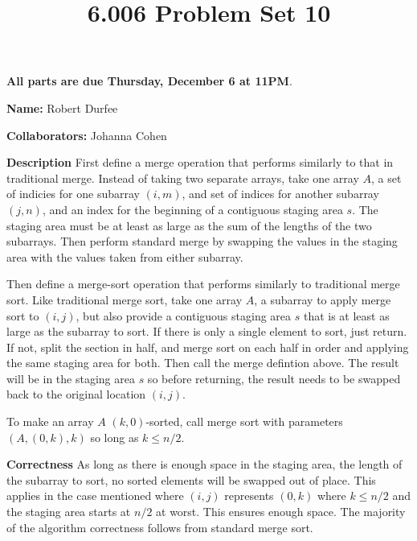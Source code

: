\documentclass[12pt,twoside]{article}
\title{6.006 Problem Set 10}
\newcommand{\theproblemsetnum}{10}
\newcommand{\releasedate}{Thursday, November 29}
\newcommand{\partaduedate}{Thursday, December 6}
\begin{document}
\handout{Problem Set \theproblemsetnum}{\releasedate}
\textbf{All parts are due {\bf \partaduedate} at {\bf 11PM}}.

\setlength{\parindent}{0pt}
\medskip\hrulefill\medskip

{\bf Name:} Robert Durfee

\medskip

{\bf Collaborators:} Johanna Cohen

\medskip\hrulefill

\begin{problems}

\problem  %

\begin{problemparts}
\problempart %

{\bf Description} First define a merge operation that performs similarly to
that in traditional merge. Instead of taking two separate arrays, take one
array $A$, a set of indicies for one subarray $(i, m)$, and set of indices
for another subarray $(j, n)$, and an index for the beginning of a contiguous
staging area $s$. The staging area must be at least as large as the sum of
the lengths of the two subarrays. Then perform standard merge by swapping the
values in the staging area with the values taken from either subarray.

Then define a merge-sort operation that performs similarly to traditional
merge sort. Like traditional merge sort, take one array $A$, a subarray to
apply merge sort to $(i, j)$, but also provide a contiguous staging area $s$
that is at least as large as the subarray to sort. If there is only a single
element to sort, just return. If not, split the section in half, and merge
sort on each half in order and applying the same staging area for both. Then
call the merge defintion above. The result will be in the staging area $s$ so
before returning, the result needs to be swapped back to the original
location $(i, j)$.

To make an array $A$ $(k, 0)$-sorted, call merge sort with parameters $(A,
(0, k), k)$ so long as $k \leq n / 2$.

{\bf Correctness} As long as there is enough space in the staging area, the
length of the subarray to sort, no sorted elements will be swapped out of
place. This applies in the case mentioned where $(i, j)$ represents $(0, k)$
where $k \leq n/2$ and the staging area starts at $n/2$ at worst. This
ensures enough space. The majority of the algorithm correctness follows from
standard merge sort.


\end{problemparts}
\end{problems}
\end{document}
